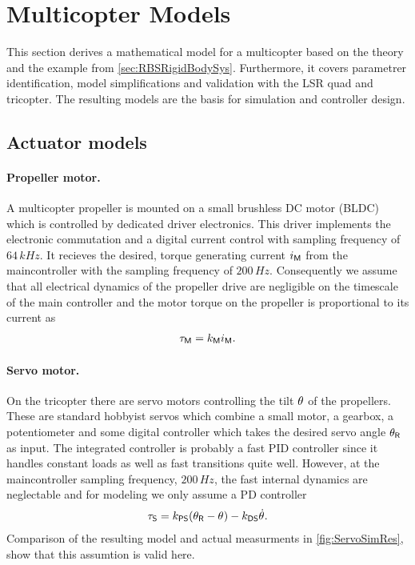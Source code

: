\section{Multicopter Models}\label{sec:RealizationModels}
This section derives a mathematical model for a multicopter based on the theory and the example from \autoref{sec:RBSRigidBodySys}.
Furthermore, it covers parametrer identification, model simplifications and validation with the LSR quad and tricopter.
The resulting models are the basis for simulation and controller design. 

\subsection{Actuator models}

\paragraph{Propeller motor.}
A multicopter propeller is mounted on a small brushless DC motor (BLDC) which is controlled by dedicated driver electronics.
This driver implements the electronic commutation and a digital current control with sampling frequency of $64\,\unit{kHz}$.
It recieves the desired, torque generating current $i_{\mathsf{M}}$ from the maincontroller with the sampling frequency of $200\,\unit{Hz}$. 
Consequently we assume that all electrical dynamics of the propeller drive are negligible on the timescale of the main controller and the motor torque on the propeller is proportional to its current as
\begin{align}
 \tau_{\mathsf{M}} = k_{\mathsf{M}} i_{\mathsf{M}}.
\end{align}

\paragraph{Servo motor.}
On the tricopter there are servo motors controlling the tilt $\theta_{}$ of the propellers.
These are standard hobbyist servos which combine a small motor, a gearbox, a potentiometer and some digital controller which takes the desired servo angle $\theta_{\mathsf{R}}$ as input.
The integrated controller is probably a fast PID controller since it handles constant loads as well as fast transitions quite well.
However, at the maincontroller sampling frequency, $200\,\unit{Hz}$, the fast internal dynamics are neglectable and for modeling we only assume a PD controller
\begin{align}
 \tau_{\mathsf{S}} = k_{\mathsf{PS}} (\theta_{\mathsf{R}} - \theta_{}) - k_{\mathsf{DS}} \dot{\theta}_{}.
\end{align}
Comparison of the resulting model and actual measurments in \autoref{fig:ServoSimRes}, show that this assumtion is valid here.


